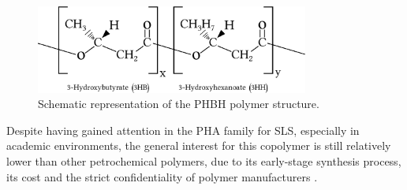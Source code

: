 \documentclass{article}
\begin{document}
    \begin{figure}[ht]
        \centering
        \includegraphics[width=0.8\textwidth]{Pictures/PHBH_chain.eps}
        \caption{Schematic representation of the PHBH polymer structure.}
        \label{fig:PHBH_structure}
    \end{figure}
    
    Despite having gained attention in the PHA family for SLS, especially in academic environments, the general interest for this copolymer
    is still relatively lower than other 
    petrochemical polymers, due to its early-stage synthesis process, its cost and the strict confidentiality 
    of polymer manufacturers \autocite{Eraslan_PHBH_review}.  

    
    \clearpage
\end{document}

